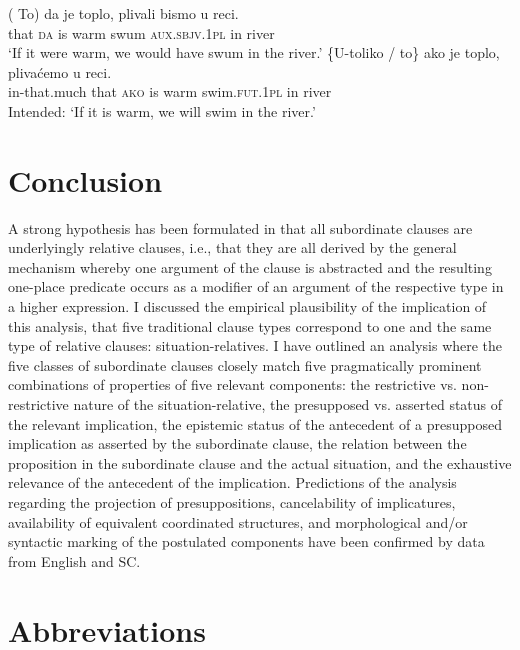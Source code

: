 \documentclass[output=paper,
colorlinks,
citecolor=brown,
newtxmath
]{langscibook}
\begin{document}
\ea\label{ex:Correl2}
		\ea \gll (\minsp{*} To) da je toplo, plivali bismo u reci.\\
{}{} that  \textsc{da}  is  warm  swum  \textsc{aux.sbjv.1pl}  in  river\\
\glt `If it were warm, we would have swum in the river.'\label{ex:Correl2-a}
	\ex \gll \minsp{*} \{U-toliko / to\} ako je toplo, plivaćemo u reci.\\
    {} in-that.much {} that  \textsc{ako} is warm swim.\textsc{fut.1pl} in river\\
\glt Intended: `If it is warm, we will swim in the river.'\label{ex:Correl2-b}
\z\z


\section{Conclusion}\label{sec:Conclusion}
A strong hypothesis has been formulated in \cite{Arsenijevic2006} that all subordinate clauses are underlyingly relative clauses, i.e., that they are all derived by the general mechanism whereby one argument of the clause is abstracted and the resulting one-place predicate occurs as a modifier of an argument of the respective type in a higher expression. I discussed the empirical plausibility of the implication of this analysis, that five traditional clause types correspond to one and the same type of relative clauses: situation-relatives. I have outlined an analysis where the five classes of subordinate clauses closely match five pragmatically prominent combinations of properties of five relevant components: the restrictive vs. non-restrictive nature of the situation-relative, the presupposed vs. asserted status of the relevant implication, the epistemic status of the antecedent of a presupposed implication as asserted by the subordinate clause, the relation between the proposition in the subordinate clause and the actual situation, and the exhaustive relevance of the antecedent of the implication. Predictions of the analysis regarding the projection of presuppositions, cancelability of implicatures, availability of equivalent coordinated structures, and morphological and/or syntactic marking of the postulated components have been confirmed by data from English and SC.


\section*{Abbreviations}
\end{document}
